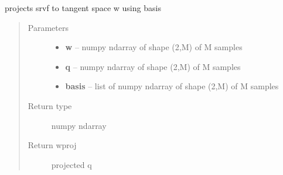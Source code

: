 \documentclass[letterpaper,10pt,english]{sphinxmanual}
\begin{document}

\begin{fulllineitems}
\label{curve_functions:curve_functions.project_tangent}
projects srvf to tangent space w using basis
\begin{quote}\begin{description}
\item[{Parameters}] \leavevmode\begin{itemize}
\item {} 
\textbf{w} -- numpy ndarray of shape (2,M) of M samples

\item {} 
\textbf{q} -- numpy ndarray of shape (2,M) of M samples

\item {} 
\textbf{basis} -- list of numpy ndarray of shape (2,M) of M samples

\end{itemize}

\item[{Return type}] \leavevmode
numpy ndarray

\item[{Return wproj}] \leavevmode
projected q

\end{description}\end{quote}

\end{fulllineitems}

\end{document}
